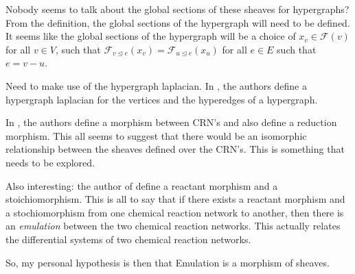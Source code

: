 \documentclass[12pt]{article}
\newcommand{\F}{\mathcal{F}}
\newcommand{\<}{\langle}
\renewcommand{\>}{\rangle}
\begin{document}
Nobody seems to talk about the global sections of these sheaves for hypergraphs? 
From the definition, the global sections of the hypergraph will need to be defined.
It seems like the global sections of the hypergraph will be a choice of $x_v \in \F(v)$ for
all $v \in V$, such that $\F_{v \trianglelefteq e}(x_v) = \F_{u \trianglelefteq e}(x_u)$ for all
$e \in E$ such that $e = v - u$.

Need to make use of the hypergraph laplacian. In \cite{jost2018hypergraph}, the authors define
a hypergraph laplacian for the vertices and the hyperedges of a hypergraph.

In \cite{Hirono2021}, the authors define a morphism between CRN's and also define a reduction
morphism. This all seems to suggest that there would be an isomorphic relationship between the
sheaves defined over the CRN's. This is something that needs to be explored.

Also interesting: the author of \cite{MorphismsReaction} define a reactant morphism and a 
stoichiomorphism. This is all to say that if there exists a reactant morphism and a stochiomorphism
from one chemical reaction network to another, then there is an \textit{emulation} between the two
chemical reaction networks. This actually relates the differential systems of two chemical reaction
networks. 

So, my personal hypothesis is then that Emulation is a morphism of sheaves.



\end{document}
